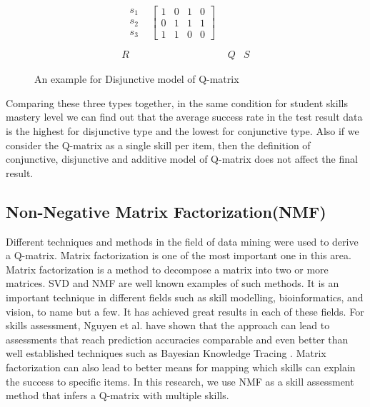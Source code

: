 \begin{figure}
\begin{footnotesize}
\[\begin{array}{ccc}
\begin{array}{cc}
\begin{array}{c}
s_{1}\\
s_{2}\\
s_{3}
\end{array} & \left[\begin{array}{cccc}
1 & 0 & 1 & 0\\
0 & 1 & 1 & 1\\
1 & 1 & 0 & 0
\end{array}\right]
\end{array}\\
\\
R & Q & S
\end{array}
\]
 \end{footnotesize} \caption{An example for Disjunctive model of Q-matrix}


\label{fig1Dis} 
\end{figure}

Comparing these three types together, in the same condition for student skills mastery level we can find out that the average success rate in the test result data is the highest for disjunctive type and the lowest for conjunctive type. Also if we consider the Q-matrix as a single skill per item, then the definition of conjunctive, disjunctive and additive model of Q-matrix does not affect the final result.


\subsection{Non-Negative Matrix Factorization(\ac{NMF})}

Different techniques and methods in the field of data mining were used to derive a Q-matrix. Matrix factorization is one of the most important one in this area. Matrix factorization is a method to decompose a matrix into two or more matrices. SVD and NMF are well known examples of such methods. It is an important technique in different fields such as skill modelling, bioinformatics, and vision, to name but a few. It has achieved great results in each of these fields. For skills assessment, Nguyen et al. \citep{Nguyen2011} have shown that the approach can lead to assessments that reach prediction accuracies comparable and even better than well established techniques such as Bayesian Knowledge Tracing \citep{corbett:umuai:1995}. Matrix factorization can also lead to better means for mapping which skills can explain the success to specific items. In this research, we use NMF as a skill assessment method that infers a Q-matrix with multiple skills.

